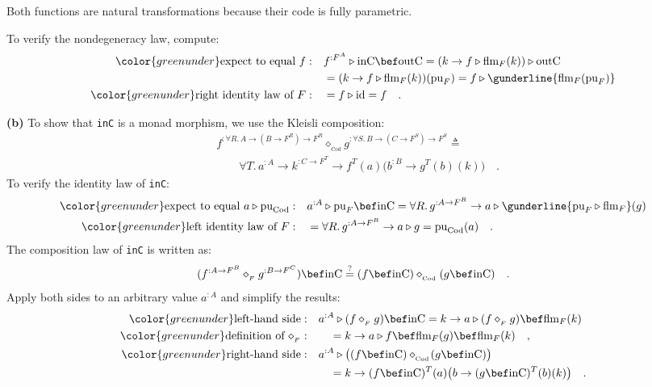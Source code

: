 Both functions are natural transformations because their code is fully
parametric.

To verify the nondegeneracy law, compute:
\begin{align*}
{\color{greenunder}\text{expect to equal }f:}\quad & f^{:F^{A}}\triangleright\text{inC}\bef\text{outC}=(k\rightarrow f\triangleright\text{flm}_{F}(k))\triangleright\text{outC}\\
 & =(k\rightarrow f\triangleright\text{flm}_{F}(k))(\text{pu}_{F})=f\triangleright\gunderline{\text{flm}_{F}(\text{pu}_{F})}\\
{\color{greenunder}\text{right identity law of }F:}\quad & =f\triangleright\text{id}=f\quad.
\end{align*}

\textbf{(b)} To show that \lstinline!inC! is a monad morphism, we
use the Kleisli composition:
\begin{align*}
 & f^{:\forall R.\,A\rightarrow(B\rightarrow F^{R})\rightarrow F^{R}}\diamond_{_{\text{Cod}}}g^{:\forall S.\,B\rightarrow(C\rightarrow F^{S})\rightarrow F^{S}}\triangleq\\
 & \quad\quad\forall T.\,a^{:A}\rightarrow k^{:C\rightarrow F^{T}}\rightarrow f^{T}(a)\big(b^{:B}\rightarrow g^{T}(b)(k)\big)\quad.
\end{align*}
To verify the identity law of \lstinline!inC!:
\begin{align*}
{\color{greenunder}\text{expect to equal }a\triangleright\text{pu}_{\text{Cod}}:}\quad & a^{:A}\triangleright\text{pu}_{F}\bef\text{inC}=\forall R.\,g^{:A\rightarrow F^{R}}\rightarrow a\triangleright\gunderline{\text{pu}_{F}\triangleright\text{flm}_{F}}(g)\\
{\color{greenunder}\text{left identity law of }F:}\quad & =\forall R.\,g^{:A\rightarrow F^{R}}\rightarrow a\triangleright g=\text{pu}_{\text{Cod}}(a)\quad.
\end{align*}
The composition law of \lstinline!inC! is written as:
\[
(f^{:A\rightarrow F^{B}}\diamond_{_{F}}g^{:B\rightarrow F^{C}})\bef\text{inC}\overset{?}{=}(f\bef\text{inC})\diamond_{_{\text{Cod}}}(g\bef\text{inC})\quad.
\]
Apply both sides to an arbitrary value $a^{:A}$ and simplify the
results:
\begin{align*}
{\color{greenunder}\text{left-hand side}:}\quad & a^{:A}\triangleright(f\diamond_{_{F}}g)\bef\text{inC}=k\rightarrow a\triangleright(f\diamond_{_{F}}g)\bef\text{flm}_{F}(k)\\
{\color{greenunder}\text{definition of }\diamond_{_{F}}:}\quad & \quad=k\rightarrow a\triangleright f\bef\text{flm}_{F}(g)\bef\text{flm}_{F}(k)\quad,\\
{\color{greenunder}\text{right-hand side}:}\quad & a^{:A}\triangleright\big((f\bef\text{inC})\diamond_{_{\text{Cod}}}\!(g\bef\text{inC})\big)\\
 & \quad=k\rightarrow(f\bef\text{inC})^{T}(a)\big(b\rightarrow(g\bef\text{inC})^{T}(b)(k)\big)\quad.
\end{align*}
